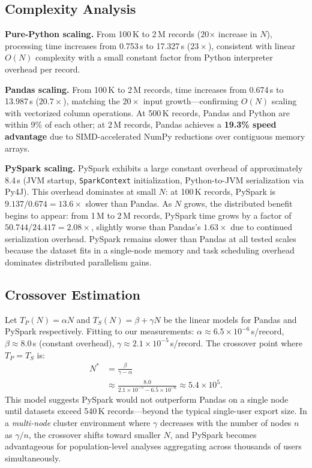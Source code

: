 \documentclass[conference]{IEEEtran}
\begin{document}
\subsection{Complexity Analysis}

\textbf{Pure-Python scaling.}
From 100\,K to 2\,M records (20$\times$ increase in $N$), processing time
increases from 0.753\,s to 17.327\,s ($23\times$), consistent with linear
$O(N)$ complexity with a small constant factor from Python interpreter
overhead per record.

\textbf{Pandas scaling.}
From 100\,K to 2\,M records, time increases from 0.674\,s to 13.987\,s
($20.7\times$), matching the $20\times$ input growth—confirming $O(N)$
scaling with vectorized column operations. At 500\,K records, Pandas
and Python are within 9\% of each other; at 2\,M records, Pandas achieves
a \textbf{19.3\% speed advantage} due to SIMD-accelerated NumPy reductions
over contiguous memory arrays.

\textbf{PySpark scaling.}
PySpark exhibits a large constant overhead of approximately 8.4\,s
(JVM startup, \texttt{SparkContext} initialization, Python-to-JVM
serialization via Py4J). This overhead dominates at small $N$: at 100\,K
records, PySpark is $9.137 / 0.674 = \mathbf{13.6\times}$ slower than Pandas.
As $N$ grows, the distributed benefit begins to appear: from 1\,M to
2\,M records, PySpark time grows by a factor of $50.744 / 24.417 = 2.08\times$,
slightly worse than Pandas's $1.63\times$ due to continued serialization
overhead. PySpark remains slower than Pandas at all tested scales because
the dataset fits in a single-node memory and task scheduling overhead
dominates distributed parallelism gains.

\subsection{Crossover Estimation}

Let $T_P(N) = \alpha N$ and $T_S(N) = \beta + \gamma N$ be the linear
models for Pandas and PySpark respectively. Fitting to our measurements:
$\alpha \approx 6.5 \times 10^{-6}$\,s/record,
$\beta \approx 8.0$\,s (constant overhead),
$\gamma \approx 2.1 \times 10^{-5}$\,s/record.
The crossover point where $T_P = T_S$ is:
\begin{equation}
\begin{aligned}
  N^* &= \frac{\beta}{\gamma - \alpha} \\
      &\approx \frac{8.0}{2.1\times10^{-5} - 6.5\times10^{-6}}
       \approx 5.4\times10^5.
\end{aligned}
\end{equation}
This model suggests PySpark would not outperform Pandas on a single node
until datasets exceed 540\,K records—beyond the typical single-user export
size. In a \emph{multi-node} cluster environment where $\gamma$ decreases
with the number of nodes $n$ as $\gamma/n$, the crossover shifts toward
smaller $N$, and PySpark becomes advantageous for population-level analyses
aggregating across thousands of users simultaneously.
\end{document}
